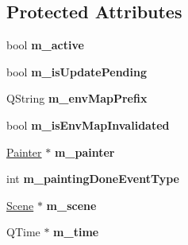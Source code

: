 \subsection*{Protected Attributes}
\begin{DoxyCompactItemize}
\item 
\hypertarget{class_painter_q_m_l_af2f0bd70fd315e03ea7b8e9275bf0012}{}bool {\bfseries m\+\_\+active}\label{class_painter_q_m_l_af2f0bd70fd315e03ea7b8e9275bf0012}

\item 
\hypertarget{class_painter_q_m_l_a3b291f7043ad8437baadf6d7be1c174d}{}bool {\bfseries m\+\_\+is\+Update\+Pending}\label{class_painter_q_m_l_a3b291f7043ad8437baadf6d7be1c174d}

\item 
\hypertarget{class_painter_q_m_l_a60f7fcbca84633e58f2facb4b805c494}{}Q\+String {\bfseries m\+\_\+env\+Map\+Prefix}\label{class_painter_q_m_l_a60f7fcbca84633e58f2facb4b805c494}

\item 
\hypertarget{class_painter_q_m_l_ac4cdaa622f2b608a364051f06d3f9d18}{}bool {\bfseries m\+\_\+is\+Env\+Map\+Invalidated}\label{class_painter_q_m_l_ac4cdaa622f2b608a364051f06d3f9d18}

\item 
\hypertarget{class_painter_q_m_l_a6b21bae1a75260e121bc56cda38729c8}{}\hyperlink{class_painter}{Painter} $\ast$ {\bfseries m\+\_\+painter}\label{class_painter_q_m_l_a6b21bae1a75260e121bc56cda38729c8}

\item 
\hypertarget{class_painter_q_m_l_a7a6641710573e4fa47dfdae13e87d58e}{}int {\bfseries m\+\_\+painting\+Done\+Event\+Type}\label{class_painter_q_m_l_a7a6641710573e4fa47dfdae13e87d58e}

\item 
\hypertarget{class_painter_q_m_l_a5eccac2ab6d9974a9ae94573ac7b19d6}{}\hyperlink{class_scene}{Scene} $\ast$ {\bfseries m\+\_\+scene}\label{class_painter_q_m_l_a5eccac2ab6d9974a9ae94573ac7b19d6}

\item 
\hypertarget{class_painter_q_m_l_ad4ced718f47b69f2344a5311ec87a156}{}Q\+Time $\ast$ {\bfseries m\+\_\+time}\label{class_painter_q_m_l_ad4ced718f47b69f2344a5311ec87a156}

\end{DoxyCompactItemize}
